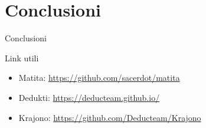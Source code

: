 \documentclass{beamer}
\begin{document}
\section{Conclusioni}
\begin{frame}{Conclusioni}
\end{frame}
\begin{frame}{Link utili}

\begin{itemize}
  \item \alert{Matita}: \href{https://github.com/sacerdot/matita}{https://github.com/sacerdot/matita}
  \vspace{1em}
  \item \alert{Dedukti}: \href{https://deducteam.github.io/}{https://deducteam.github.io/}
  \vspace{1em}
  \item \alert{Krajono}: \href{https://github.com/Deducteam/Krajono}{https://github.com/Deducteam/Krajono}
  \vspace{1em}
\end{itemize}
\end{frame}
\end{document}
